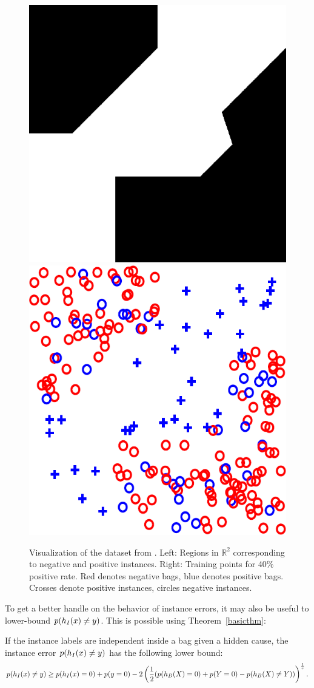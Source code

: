 \begin{figure}[tbp]
	\begin{center}
		\includegraphics[width=.40 \linewidth]{images/gehler_decision_boundary.png}\hspace{35px}
		\includegraphics[width=.40 \linewidth]{images/gehler_instances.png}
	\end{center}
	\caption{Visualization of the dataset from \citet{gehler2007deterministic}. Left: Regions in $\mathbb{R}^2$
    corresponding to negative and positive instances. Right: Training points for 40\% positive rate. Red denotes negative
    bags, blue denotes positive bags. Crosses denote positive instances, circles negative instances.}

\end{figure}
To get a better handle on the behavior of instance errors, it may also be useful to lower-bound $p(h_I(x) \neq y)$.
This is possible using Theorem~\ref{basicthm}:

\begin{theorem}\label{lowerbound}
If the instance labels are independent inside a bag given a hidden cause, the instance
error $p(h_I(x) \neq y)$ has the following lower bound:
\begin{equation}
p(h_I(x) \neq y) \geq p(h_I(x)=0) + p(y=0)
- 2 \left (\frac{1}{2} (p(h_B(X)=0) + p(Y=0) - p(h_B(X) \neq Y)) \right)^\frac{1}{r}.
\end{equation}
\end{theorem}


